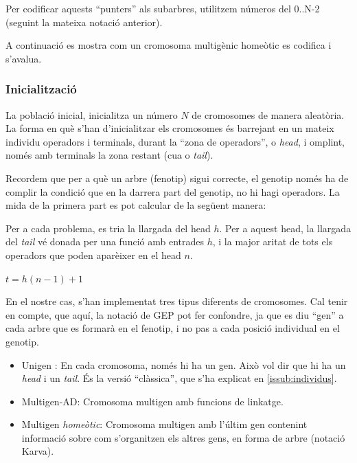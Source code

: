 Per codificar aquests ``punters'' als subarbres, utilitzem números del 0..N-2
(seguint la mateixa notació anterior).

A continuació es mostra com un cromosoma multigènic homeòtic es codifica i
s'avalua.


\subsubsection{Inicialització} %
\label{ssub:Inicialitzacio}
La població inicial, inicialitza un número $N$ de cromosomes de manera
aleatòria.  La forma en què s'han d'inicialitzar els cromosomes és barrejant en
un mateix individu operadors i terminals, durant la ``zona de operadors'', o
\emph{head}, i omplint, només amb terminals la zona restant (cua o \emph{tail}).

Recordem que per a què un arbre (fenotip) sigui correcte, el genotip només ha de
complir la condició que en la darrera part del genotip, no hi hagi operadors.
La mida de la primera part es pot calcular de la següent manera:

Per a cada problema, es tria la llargada del head $h$.  Per a aquest head, la
llargada del \emph{tail} vé donada per una funció amb entrades $h$, i la major
aritat de tots els operadors que poden aparèixer en el head $n$.

\begin{math}
t =  h (n-1) + 1
\end{math}

En el nostre cas, s'han implementat tres tipus diferents de cromosomes. Cal
tenir en compte, que aquí, la notació de GEP pot fer confondre, ja que es diu
``gen'' a cada arbre que es formarà en el fenotip, i no pas a cada posició
individual en el genotip.

\begin{itemize}
	\item Unigen : En cada cromosoma, només hi ha un gen.  Això vol dir que hi
	ha un \emph{head} i un \emph{tail}. És la versió ``clàssica'', que s'ha
	explicat en \ref{issub:individus}.
	\item Multigen-AD: Cromosoma multigen amb funcions de linkatge.
	\item Multigen \emph{homeòtic}: Cromosoma multigen amb l'últim gen contenint
	informació sobre com s'organitzen els altres gens, en forma de arbre
	(notació Karva).
\end{itemize}

